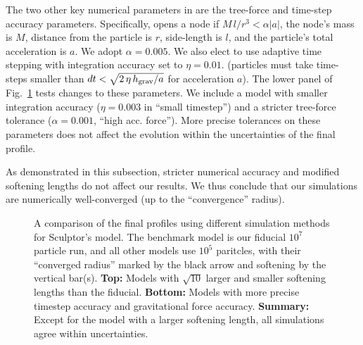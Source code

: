 The two other key numerical parameters in \gadget{} are the tree-force
and time-step accuracy parameters. Specifically, \gadget{} opens a node
if \(M\,l/r^3 < \alpha |a|\), the node's mass is \(M\), distance from
the particle is \(r\), side-length is \(l\), and the particle's total
acceleration is \(a\). We adopt \(\alpha =0.005\). We also elect to use
adaptive time stepping with integration accuracy set to \(\eta=0.01\).
(particles must take time-steps smaller than
\(dt < \sqrt{2\,\eta\,h_{\rm grav} / a}\) for acceleration \(a\)). The
lower panel of Fig.~\ref{fig:methods_convergence} tests changes to these
parameters. We include a model with smaller integration accuracy
(\(\eta=0.003\) in ``small timestep'') and a stricter tree-force
tolerance (\(\alpha=0.001\), ``high acc. force''). More precise
tolerances on these parameters does not affect the evolution within the
uncertainties of the final profile.

As demonstrated in this subsection, stricter numerical accuracy and
modified softening lengths do not affect our results. We thus conclude
that our simulations are numerically well-converged (up to the
``convergence'' radius).

\begin{figure}
\centering
{}
\caption[Isolation method convergence]{A comparison of the final
profiles using different simulation methods for Sculptor's \smallperi{}
model. The benchmark model is our fiducial \(10^7\) particle run, and
all other models use \(10^5\) paritcles, with their ``converged radius''
marked by the black arrow and softening by the vertical bar(s).
\textbf{Top:} Models with \(\sqrt{10}\) larger and smaller softening
lengths than the fiducial. \textbf{Bottom:} Models with more precise
timestep accuracy and gravitational force accuracy. \textbf{Summary:}
Except for the model with a larger softening length, all simulations
agree within uncertainties.}\label{fig:methods_convergence}
\end{figure}
